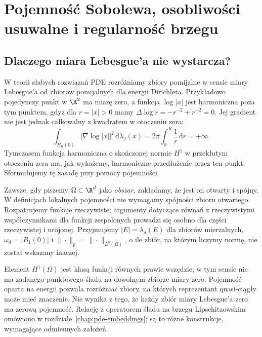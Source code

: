 \chapter[Pojemność Sobolewa i osobliwości]{Pojemność Sobolewa, osobliwości usuwalne i regularność brzegu}
\label{chap:pde19}

\section{Dlaczego miara Lebesgue'a nie wystarcza?}
\label{sec:pde19-motivation}
W teorii słabych rozwiązań PDE rozróżniamy zbiory pomijalne w sensie
miary Lebesgue'a od zbiorów pomijalnych dla energii Dirichleta.
Przykładowo pojedynczy punkt w $\R^2$ ma miarę zero, a funkcja
$\log|x|$ jest harmoniczna poza tym punktem, gdyż
dla $r=|x|>0$ mamy $\Delta\log r=-r^{-2}+r^{-2}=0$.
Jej gradient nie jest jednak całkowalny z kwadratem
w otoczeniu zera:
\[
 \int_{B_R(0)}|\nabla\log|x||^2\,\mathrm d\lambda_2(x)
 =2\pi\int_0^R\frac{1}{r}\,\mathrm dr=+\infty.
\]
Tymczasem funkcja harmoniczna o skończonej normie
$H^1$ w przekłutym otoczeniu zera ma, jak wykażemy,
harmoniczne przedłużenie przez ten punkt. Sformułujemy tę zasadę przy
pomocy pojemności.

Zawsze, gdy piszemy $\Omega\subset\R^d$ jako \emph{obszar},
zakładamy, że jest on otwarty i spójny. W definicjach lokalnych
pojemności nie wymagamy spójności zbioru otwartego.
Rozpatrujemy funkcje rzeczywiste; argumenty dotyczące
równań z rzeczywistymi współczynnikami dla funkcji zespolonych
prowadzi się osobno dla części rzeczywistej i urojonej.
Przyjmujemy $|E|=\lambda_d(E)$ dla zbiorów mierzalnych,
$\omega_d=|B_1(0)|$ i $\|\cdot\|_p=\|\cdot\|_{L^p(\Omega)}$,
o ile zbiór, na którym liczymy normę, nie został wskazany inaczej.

\begin{uwaga}
\label{rem:pde-v43-capacity-ae}
Element $H^1(\Omega)$ jest klasą funkcji równych prawie
wszędzie; w tym sensie nie ma zadanego punktowego śladu
na dowolnym zbiorze miary zero. Pojemność oparta na energii
pozwala rozróżniać zbiory, na których reprezentant
quasi-ciągły może mieć znaczenie. Nie wynika z tego, że
każdy zbiór miary Lebesgue'a zero ma zerową pojemność.
Relację z operatorem śladu na brzegu Lipschitzowskim
omówiono w rozdziale~\ref{chap:pde-embeddings}; są to
różne konstrukcje, wymagające odmiennych założeń.
\end{uwaga}

